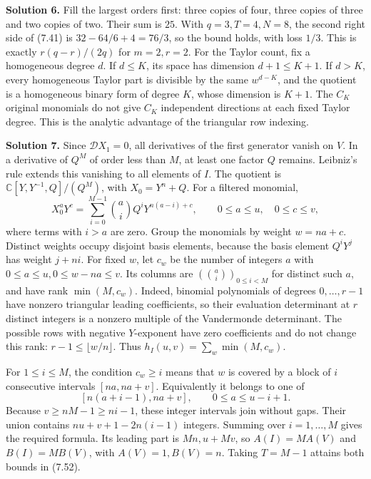 \documentclass[
  11pt,
  a4paper,
]{article}
\begin{document}
\textbf{Solution 6.} Fill the largest orders first: three copies of
four, three copies of three and two copies of two. Their sum is \(25\).
With \(q=3,T=4,N=8\), the second right side of (7.41) is
\(32-64/6+4=76/3\), so the bound holds, with loss \(1/3\). This is
exactly \(r(q-r)/(2q)\) for \(m=2,r=2\). For the Taylor count, fix a
homogeneous degree \(d\). If \(d\le K\), its space has dimension
\(d+1\le K+1\). If \(d>K\), every homogeneous Taylor part is divisible
by the same \(w^{d-K}\), and the quotient is a homogeneous binary form
of degree \(K\), whose dimension is \(K+1\). The \(C_K\) original
monomials do not give \(C_K\) independent directions at each fixed
Taylor degree. This is the analytic advantage of the triangular row
indexing.

\textbf{Solution 7.} Since \(\mathcal D X_1=0\), all derivatives of the
first generator vanish on \(V\). In a derivative of \(Q^M\) of order
less than \(M\), at least one factor \(Q\) remains. Leibniz's rule
extends this vanishing to all elements of \(I\). The quotient is
\(\mathbb C[Y,Y^{-1},Q]/(Q^M)\), with \(X_0=Y^n+Q\). For a filtered
monomial, \[
X_0^aY^c=\sum_{i=0}^{M-1}\binom ai Q^iY^{n(a-i)+c},
\qquad 0\le a\le u,\quad0\le c\le v,
\] where terms with \(i>a\) are zero. Group the monomials by weight
\(w=na+c\). Distinct weights occupy disjoint basis elements, because the
basis element \(Q^iY^j\) has weight \(j+ni\). For fixed \(w\), let
\(c_w\) be the number of integers \(a\) with
\(0\le a\le u,0\le w-na\le v\). Its columns are
\((\binom ai)_{0\le i<M}\) for distinct such \(a\), and have rank
\(\min(M,c_w)\). Indeed, binomial polynomials of degrees
\(0,\ldots,r-1\) have nonzero triangular leading coefficients, so their
evaluation determinant at \(r\) distinct integers is a nonzero multiple
of the Vandermonde determinant. The possible rows with negative
\(Y\)-exponent have zero coefficients and do not change this rank:
\(r-1\le\lfloor w/n\rfloor\). Thus \(h_I(u,v)=\sum_w\min(M,c_w)\).

For \(1\le i\le M\), the condition \(c_w\ge i\) means that \(w\) is
covered by a block of \(i\) consecutive intervals \([na,na+v]\).
Equivalently it belongs to one of \[
[n(a+i-1),na+v],\qquad0\le a\le u-i+1.
\] Because \(v\ge nM-1\ge ni-1\), these integer intervals join without
gaps. Their union contains \(nu+v+1-2n(i-1)\) integers. Summing over
\(i=1,\ldots,M\) gives the required formula. Its leading part is
\(Mn,u+M v\), so \(A(I)=M A(V)\) and \(B(I)=M B(V)\), with
\(A(V)=1,B(V)=n\). Taking \(T=M-1\) attains both bounds in (7.52).
\end{document}
